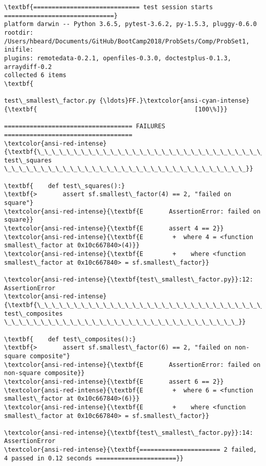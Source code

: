 \documentclass[11pt]{article}
\begin{document}
    \begin{Verbatim}[commandchars=\\\{\}]
\textbf{============================= test session starts ==============================}
platform darwin -- Python 3.6.5, pytest-3.6.2, py-1.5.3, pluggy-0.6.0
rootdir: /Users/hbeard/Documents/GitHub/BootCamp2018/ProbSets/Comp/ProbSet1, inifile:
plugins: remotedata-0.2.1, openfiles-0.3.0, doctestplus-0.1.3, arraydiff-0.2
collected 6 items                                                              \textbf{

test\_smallest\_factor.py {\ldots}FF.}\textcolor{ansi-cyan-intense}{\textbf{                                           [100\%]}}

=================================== FAILURES ===================================
\textcolor{ansi-red-intense}{\textbf{\_\_\_\_\_\_\_\_\_\_\_\_\_\_\_\_\_\_\_\_\_\_\_\_\_\_\_\_\_\_\_\_\_ test\_squares \_\_\_\_\_\_\_\_\_\_\_\_\_\_\_\_\_\_\_\_\_\_\_\_\_\_\_\_\_\_\_\_\_}}

\textbf{    def test\_squares():}
\textbf{>       assert sf.smallest\_factor(4) == 2, "failed on square"}
\textcolor{ansi-red-intense}{\textbf{E       AssertionError: failed on square}}
\textcolor{ansi-red-intense}{\textbf{E       assert 4 == 2}}
\textcolor{ansi-red-intense}{\textbf{E        +  where 4 = <function smallest\_factor at 0x10c667840>(4)}}
\textcolor{ansi-red-intense}{\textbf{E        +    where <function smallest\_factor at 0x10c667840> = sf.smallest\_factor}}

\textcolor{ansi-red-intense}{\textbf{test\_smallest\_factor.py}}:12: AssertionError
\textcolor{ansi-red-intense}{\textbf{\_\_\_\_\_\_\_\_\_\_\_\_\_\_\_\_\_\_\_\_\_\_\_\_\_\_\_\_\_\_\_ test\_composites \_\_\_\_\_\_\_\_\_\_\_\_\_\_\_\_\_\_\_\_\_\_\_\_\_\_\_\_\_\_\_\_}}

\textbf{    def test\_composites():}
\textbf{>       assert sf.smallest\_factor(6) == 2, "failed on non-square composite"}
\textcolor{ansi-red-intense}{\textbf{E       AssertionError: failed on non-square composite}}
\textcolor{ansi-red-intense}{\textbf{E       assert 6 == 2}}
\textcolor{ansi-red-intense}{\textbf{E        +  where 6 = <function smallest\_factor at 0x10c667840>(6)}}
\textcolor{ansi-red-intense}{\textbf{E        +    where <function smallest\_factor at 0x10c667840> = sf.smallest\_factor}}

\textcolor{ansi-red-intense}{\textbf{test\_smallest\_factor.py}}:14: AssertionError
\textcolor{ansi-red-intense}{\textbf{====================== 2 failed, 4 passed in 0.12 seconds ======================}}

    \end{Verbatim}
\end{document}
